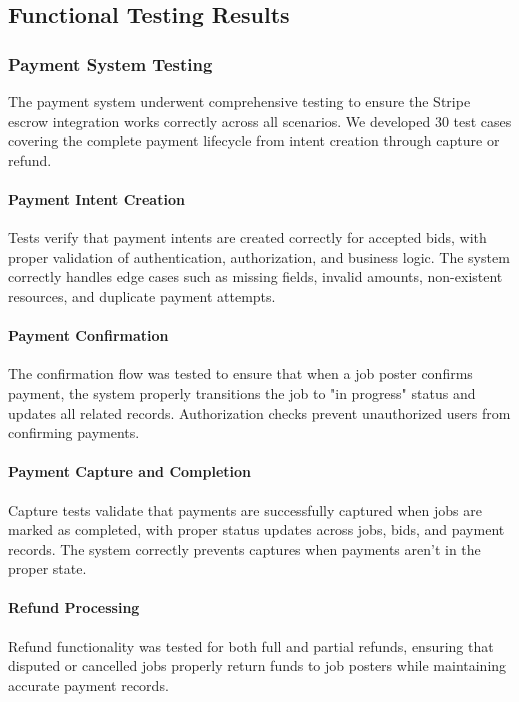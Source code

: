 \documentclass[11pt]{article}
\begin{document}
\subsection{Functional Testing Results}

\subsubsection{Payment System Testing}
The payment system underwent comprehensive testing to ensure the Stripe escrow integration works correctly across all scenarios. We developed 30 test cases covering the complete payment lifecycle from intent creation through capture or refund.

\paragraph{Payment Intent Creation}
Tests verify that payment intents are created correctly for accepted bids, with proper validation of authentication, authorization, and business logic. The system correctly handles edge cases such as missing fields, invalid amounts, non-existent resources, and duplicate payment attempts.

\paragraph{Payment Confirmation}
The confirmation flow was tested to ensure that when a job poster confirms payment, the system properly transitions the job to "in progress" status and updates all related records. Authorization checks prevent unauthorized users from confirming payments.

\paragraph{Payment Capture and Completion}
Capture tests validate that payments are successfully captured when jobs are marked as completed, with proper status updates across jobs, bids, and payment records. The system correctly prevents captures when payments aren't in the proper state.

\paragraph{Refund Processing}
Refund functionality was tested for both full and partial refunds, ensuring that disputed or cancelled jobs properly return funds to job posters while maintaining accurate payment records.
\end{document}

